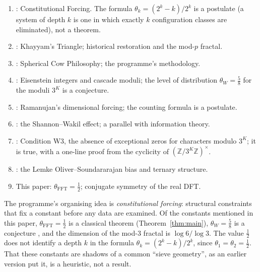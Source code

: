 \documentclass[12pt]{article}
\theoremstyle{definition}
\newcommand{\Z}{\mathbb{Z}}
\newcommand{\thetaFFT}{\theta_{\mathrm{FFT}}}
\begin{document}
\begin{enumerate}[noitemsep]
  \item \cite{Wakil2026Forcing}: Constitutional Forcing.  The formula
        $\theta_k = (2^k - k)/2^k$ is a postulate (a system of depth $k$
        is one in which exactly $k$ configuration classes are
        eliminated), not a theorem.
  \item \cite{Wakil2026Khayyam}: Khayyam's Triangle; historical
        restoration and the mod-$p$ fractal.
  \item \cite{Wakil2026SphericalCow}: Spherical Cow Philosophy; the
        programme's methodology.
  \item \cite{Wakil2026Eisenstein}: Eisenstein integers and cascade
        moduli; the level of distribution $\theta_W = \tfrac{5}{8}$ for
        the moduli $3^K$ is a conjecture.
  \item \cite{Wakil2026Ramanujan}: Ramanujan's dimensional forcing; the
        counting formula is a postulate.
  \item \cite{Wakil2026Shannon}: the Shannon--Wakil effect; a parallel
        with information theory.
  \item \cite{Wakil2026ConditionW3}: Condition W3, the absence of
        exceptional zeros for characters modulo $3^K$; it is true, with a
        one-line proof from the cyclicity of $(\Z/3^K\Z)^\times$.
  \item \cite{Wakil2026Bias}: the Lemke Oliver--Soundararajan bias and
        ternary structure.
  \item This paper: $\thetaFFT = \tfrac{1}{2}$; conjugate symmetry of the
        real DFT.
\end{enumerate}

The programme's organising idea is \emph{constitutional forcing}:
structural constraints that fix a constant before any data are examined.
Of the constants mentioned in this paper, $\thetaFFT = \tfrac{1}{2}$ is a
classical theorem (Theorem~\ref{thm:main}), $\theta_W = \tfrac{5}{8}$ is
a conjecture \cite{Wakil2026Eisenstein}, and the dimension of the mod-3
fractal is $\log 6/\log 3$.  The value $\tfrac{1}{2}$ does not identify a
depth $k$ in the formula $\theta_k = (2^k - k)/2^k$, since
$\theta_1 = \theta_2 = \tfrac{1}{2}$.  That these constants are shadows of
a common ``sieve geometry'', as an earlier version put it, is a
heuristic, not a result.
\end{document}
